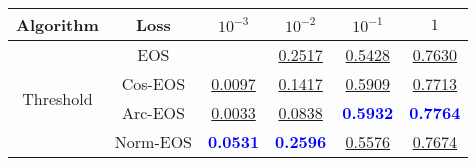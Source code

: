 \begin{table}[t]
\centering
\begin{tabularx}{.7\textwidth}{c|c|cccc}
\bf Algorithm & \bf Loss & $10^{-3}$ & $10^{-2}$ & $10^{-1}$ & $1$\\\hline\hline
\multirow{4}{*}{Threshold} & EOS & & \underline{0.2517} & \underline{0.5428} & \underline{0.7630}\\
 & Cos-EOS & \underline{0.0097} & \underline{0.1417} & \underline{0.5909} & \underline{0.7713}\\
 & Arc-EOS & \underline{0.0033} & \underline{0.0838} & \textcolor{blue}{\bf 0.5932} & \textcolor{blue}{\bf 0.7764}\\
 & Norm-EOS & \textcolor{blue}{\bf 0.0531} & \textcolor{blue}{\bf 0.2596} & \underline{0.5576} & \underline{0.7674}\\
\hline
\end{tabularx}
\end{table}